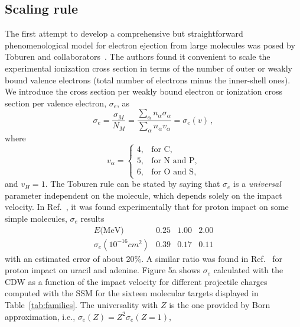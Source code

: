 \documentclass[preprint,showpacs,pra]{revtex4-1}
\begin{document}
\subsection{Scaling rule}

The first attempt to develop a comprehensive but straightforward 
phenomenological model for electron ejection from large molecules was 
posed by Toburen and collaborators~\cite{toburen1975,toburen1976}. 
The authors found it convenient to scale the experimental ionization 
cross section in terms of the number of outer or weakly bound valence 
electrons (total number of electrons minus the inner-shell ones). 
We introduce the cross section per weakly bound electron or ionization 
cross section per valence electron, $\sigma_{e}$, as
\begin{equation}
\sigma_{e}=\frac{\sigma_{M}}{N_{M}}=\frac{\sum\limits_{\alpha}
n_{\alpha}\sigma_{\alpha}}{\sum\limits_{\alpha}n_{\alpha}v_{\alpha}}
=\sigma_{e}(v)\,, 
\label{27} 
\end{equation}
where
\begin{equation}
v_{\alpha}=\left\{ 
\begin{array}{ll}
4, & \text{for C,} \\ 
5, & \text{for N and P,} \\ 
6, & \text{for O and S,}
\end{array}\right.
\label{eq:nelec} 
\end{equation}
and $v_{H}=1$. The Toburen rule can be stated by saying that 
$\sigma_{e}$ is a \textit{universal} parameter independent on the 
molecule, which depends solely on the impact velocity. 
In Ref.~\cite{toburen1976}, it was found experimentally that for proton 
impact on some simple molecules, $\sigma_{e}$ results
\begin{equation}
\begin{array}{cccc}
E\text{(MeV)}               & 0.25 & 1.00 & 2.00 \\ 
\sigma_{e} (10^{-16}cm^{2}) & 0.39 & 0.17 & 0.11
\end{array}
\label{30}
\end{equation}
with an estimated error of about 20\%. A similar ratio was found in 
Ref.~\cite{itoh2013} for proton impact on uracil and adenine. 
Figure 5a shows $\sigma_{e}$ calculated with the CDW as a function of 
the impact velocity for different projectile charges computed with the 
SSM for the sixteen molecular targets displayed in 
Table~\ref{tab:families}. The universality with $Z$ is the one provided 
by Born approximation, i.e., $\sigma _{e}(Z)=Z^{2}\sigma_{e}(Z=1)$, 
\end{document}
